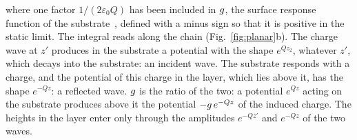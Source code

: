 \documentclass[10pt,a4paper]{paper}
\begin{document}
where one factor $1/(2\varepsilon_0 Q)$ has been included in $g$, the surface response function of the
substrate~\cite[Eqs.~(230)--(231)]{pitarke2007theory}, defined with a minus sign so that it is positive in the static
limit. The integral reads along the chain (Fig.~\ref{fig:planar}b). The charge wave at $z'$ produces in the substrate
a potential with the shape $e^{Qz_2}$, whatever $z'$, which decays into the substrate: an incident wave. The substrate
responds with a charge, and the potential of this charge in the layer, which lies above it, has the shape $e^{-Qz}$:
a reflected wave. $g$ is the ratio of the two: a potential $e^{Qz}$ acting on the substrate produces above it the
potential $-g\,e^{-Qz}$ of the induced charge. The heights in the layer enter only through the amplitudes
$e^{-Qz'}$ and $e^{-Qz}$ of the two waves.
\end{document}
